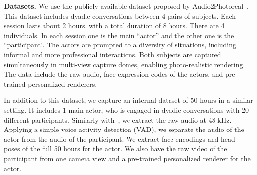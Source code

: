 \noindent
\textbf{Datasets.} We use the publicly available dataset proposed by Audio2Photoreal~\cite{ng2024audio2photoreal}. This dataset includes dyadic conversations between 4 pairs of subjects. Each session lasts about 2 hours, with a total duration of 8 hours. There are 4 individuals. In each session one is the main ``actor'' and the other one is the ``participant''.  The actors are prompted to a diversity of situations, including informal and more professional interactions. Both subjects are captured simultaneously in multi-view capture domes, enabling photo-realistic rendering. The data include the raw audio, face expression codes of the actors, and pre-trained personalized renderers.

In addition to this dataset, we capture an internal dataset of 50 hours in a similar setting. It includes 1 main actor, who is engaged in dyadic conversations with 20 different participants. Similarly with~\cite{ng2024audio2photoreal}, we extract the raw audio at 48 kHz. Applying a simple voice activity detection (VAD), we separate the audio of the actor from the audio of the participant. We extract face encodings and head poses of the full 50 hours for the actor. We also have the raw video of the participant from one camera view and a pre-trained personalized renderer for the actor.


